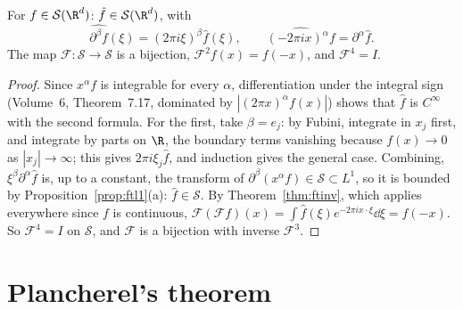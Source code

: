 \begin{proposition}\label{prop:schwartz}
For $f\in\mathcal S(\R^d)$: $\hat f\in\mathcal S(\R^d)$, with
\[\widehat{\partial^\beta f}(\xi)=(2\pi i\xi)^\beta\hat f(\xi),\qquad\widehat{(-2\pi ix)^\alpha f}=\partial^\alpha\hat f.\]
The map $\mathcal F:\mathcal S\to\mathcal S$ is a bijection, $\mathcal F^2f(x)=f(-x)$, and $\mathcal F^4=I$.
\end{proposition}
\begin{proof}
Since $x^\alpha f$ is integrable for every $\alpha$, differentiation under the integral sign (Volume~6, Theorem~7.17, dominated by $|(2\pi x)^\alpha f(x)|$) shows that $\hat f$ is $C^\infty$ with the second formula. For the first,
take $\beta=e_j$: by Fubini, integrate in $x_j$ first, and integrate by parts on $\R$, the boundary terms vanishing because $f(x)\to0$ as $|x_j|\to\infty$; this gives $2\pi i\xi_j\hat f$, and induction gives the general
case. Combining, $\xi^\beta\partial^\alpha\hat f$ is, up to a constant, the transform of $\partial^\beta(x^\alpha f)\in\mathcal S\subset L^1$, so it is bounded by Proposition~\ref{prop:ftl1}(a): $\hat f\in\mathcal S$. By
Theorem~\ref{thm:ftinv}, which applies everywhere since $f$ is continuous, $\mathcal F(\mathcal Ff)(x)=\int\hat f(\xi)e^{-2\pi ix\cdot\xi}\dd\xi=f(-x)$. So $\mathcal F^4=I$ on $\mathcal S$, and $\mathcal F$ is a bijection
with inverse $\mathcal F^3$.
\end{proof}

\section{Plancherel's theorem}

